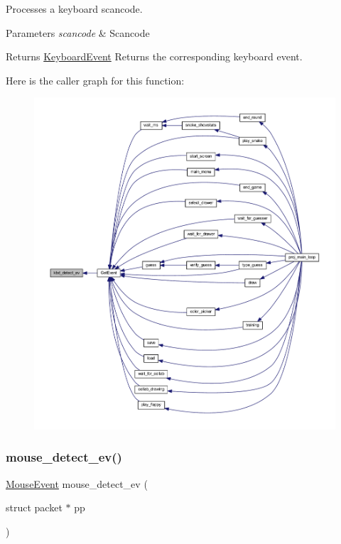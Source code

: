 Processes a keyboard scancode. 


\begin{DoxyParams}{Parameters}
{\em scancode} & Scancode \\
\hline
\end{DoxyParams}
\begin{DoxyReturn}{Returns}
\mbox{\hyperlink{struct_keyboard_event}{Keyboard\+Event}} Returns the corresponding keyboard event. 
\end{DoxyReturn}
Here is the caller graph for this function\+:\nopagebreak
\begin{figure}[H]
\begin{center}
\leavevmode
\includegraphics[width=350pt]{group__event_ga971796fc84ffc34d36bcb9d073a94e31_icgraph}
\end{center}
\end{figure}
\mbox{\label{group__event_ga556d3da45a1dc6de5d205d92b4b275b3}} 
\subsubsection{\texorpdfstring{mouse\+\_\+detect\+\_\+ev()}{mouse\_detect\_ev()}}
{\footnotesize\ttfamily \mbox{\hyperlink{struct_mouse_event}{Mouse\+Event}} mouse\+\_\+detect\+\_\+ev (\begin{DoxyParamCaption}\item[{struct packet $\ast$}]{pp }\end{DoxyParamCaption})}



